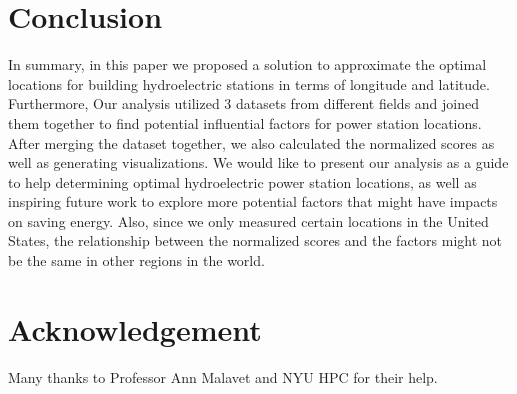 \documentclass[11pt]{article}
\begin{document}
\section{Conclusion}
In summary, in this paper we proposed a solution to approximate the optimal locations for building hydroelectric stations in terms of longitude and latitude. Furthermore, Our analysis utilized 3 datasets from different fields and joined them together to find potential influential factors for power station locations. After merging the dataset together, we also calculated the normalized scores as well as generating visualizations. We would like to present our analysis as a guide to help determining optimal hydroelectric power station locations, as well as inspiring future work to explore more potential factors that might have impacts on saving energy. Also, since we only measured certain locations in the United States, the relationship between the normalized scores and the factors might not be the same in other regions in the world.
\section*{Acknowledgement}
Many thanks to Professor Ann Malavet and NYU HPC for their help.




\end{document}
